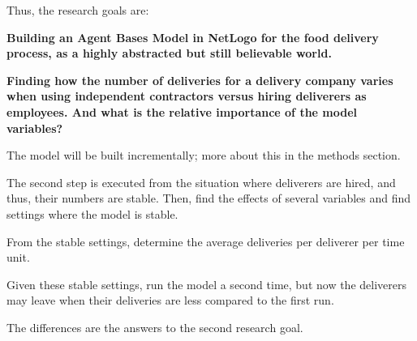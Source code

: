 Thus, the research goals are:

\textbf{Building an Agent Bases Model in NetLogo for the food delivery process, as a highly abstracted but still believable world.}

\textbf{Finding how the number of deliveries for a delivery company varies when using independent contractors versus hiring deliverers as employees.
 And what is the relative importance of the model variables?}

The model will be built incrementally; more about this in the methods section.

The second step is executed from the situation where deliverers are hired, and thus, their numbers are stable.
Then, find the effects of several variables and find settings where the model is stable.

From the stable settings, determine the average deliveries per deliverer per time unit.

Given these stable settings, run the model a second time, but now the deliverers may leave when their deliveries are less
compared to the first run.

The differences are the answers to the second research goal.


